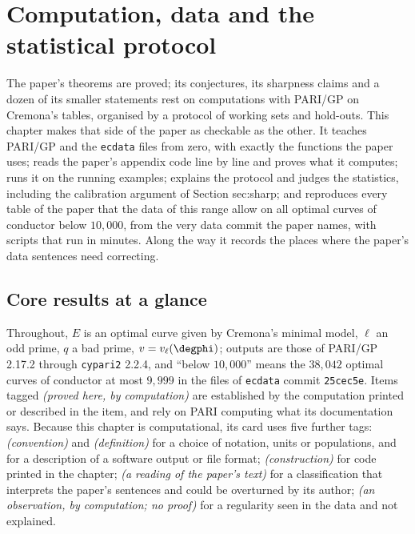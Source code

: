 \chapter{Computation, data and the statistical protocol}\label{ch:computation}

The paper's theorems are proved; its conjectures, its sharpness claims and a dozen of its smaller statements rest on computations with PARI/GP on
Cremona's tables, organised by a protocol of working sets and hold-outs. This chapter makes that side of the paper as checkable as the other. It
teaches PARI/GP and the \texttt{ecdata} files from zero, with exactly the functions the paper uses; reads the paper's appendix code line by line and
proves what it computes; runs it on the running examples; explains the protocol and judges the statistics, including the calibration argument
of Section sec:sharp; and reproduces every table of the paper that the data of this range allow on all optimal curves of conductor below $10{,}000$, from the
very data commit the paper names, with scripts that run in minutes. Along the way it records the places where the paper's data sentences need correcting.

\section*{Core results at a glance}

Throughout, $E$ is an optimal curve given by Cremona's minimal model, $\ell$ an odd prime, $q$ a bad prime, $v=v_\ell(\degphi)$; outputs are those of PARI/GP
2.17.2 through \texttt{cypari2} 2.2.4, and ``below $10{,}000$'' means the $38{,}042$ optimal curves of conductor at most $9{,}999$ in the files of \texttt{ecdata}
commit \texttt{25cec5e}. Items tagged \emph{(proved here, by computation)} are established by the computation printed or described in the item, and
rely on PARI computing what its documentation says. Because this chapter is computational, its card uses five further tags:
\emph{(convention)} and \emph{(definition)} for a choice of notation, units or populations, and for a description of a software output or file format;
\emph{(construction)} for code printed in the chapter; \emph{(a reading of the paper's text)} for a classification that interprets the paper's sentences
and could be overturned by its author; \emph{(an observation, by computation; no proof)} for a regularity seen in the data and not explained.

